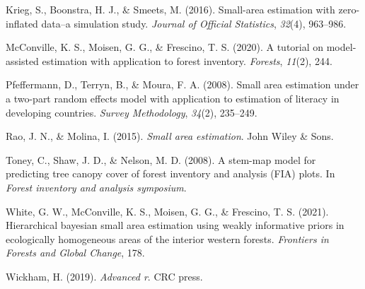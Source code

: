 \documentclass[12pt,twoside]{reedthesis}
\newlength{\cslhangindent}
\newenvironment{CSLReferences}[2] %
 {%
  \setlength{\parindent}{0pt}
  \ifodd #1 \everypar{\setlength{\hangindent}{\cslhangindent}}\ignorespaces\fi
  \ifnum #2 > 0
  \setlength{\parskip}{#2\baselineskip}
  \fi
 }%
 {}
\begin{document}
\begin{CSLReferences}{1}{0}
\leavevmode{}%
Krieg, S., Boonstra, H. J., \& Smeets, M. (2016). Small-area estimation with zero-inflated data--a simulation study. \emph{Journal of Official Statistics}, \emph{32}(4), 963--986.

\leavevmode{}%
McConville, K. S., Moisen, G. G., \& Frescino, T. S. (2020). A tutorial on model-assisted estimation with application to forest inventory. \emph{Forests}, \emph{11}(2), 244.

\leavevmode{}%
Pfeffermann, D., Terryn, B., \& Moura, F. A. (2008). Small area estimation under a two-part random effects model with application to estimation of literacy in developing countries. \emph{Survey Methodology}, \emph{34}(2), 235--249.

\leavevmode{}%
Rao, J. N., \& Molina, I. (2015). \emph{Small area estimation}. John Wiley \& Sons.

\leavevmode{}%
Toney, C., Shaw, J. D., \& Nelson, M. D. (2008). A stem-map model for predicting tree canopy cover of forest inventory and analysis (FIA) plots. In \emph{Forest inventory and analysis symposium}.

\leavevmode{}%
White, G. W., McConville, K. S., Moisen, G. G., \& Frescino, T. S. (2021). Hierarchical bayesian small area estimation using weakly informative priors in ecologically homogeneous areas of the interior western forests. \emph{Frontiers in Forests and Global Change}, 178.

\leavevmode{}%
Wickham, H. (2019). \emph{Advanced r}. CRC press.

\end{CSLReferences}

\end{document}
